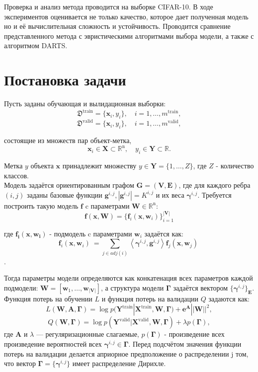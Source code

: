\documentclass[12pt,twoside]{article}
\begin{document}
Проверка и анализ метода проводится на выборке CIFAR-10\cite{CIFAR-10}. В ходе экспериментов оценивается не только качество, которое дает полученная модель но и её вычислительная сложность и устойчивость. Проводится сравнение представленного метода с эвристическими алгоритмами выбора модели, а также с алгоритмом DARTS.

\section{Постановка задачи}

Пусть заданы обучающая и вылидационная выборки:
\[
\mathfrak{D}^{\text{train}} = \{\mathbf{x}_i, y_i\}, \quad i=1,\dots,m^{\text{train}},
\]
\[
\mathfrak{D}^{\text{valid}} = \{\mathbf{x}_i, y_i\}, \quad i=1,\dots,m^{\text{valid}},
\]

состоящие из множеств пар объект-метка,
\[
\mathbf{x}_i\in\mathbf{X}\subset\mathbb{R}^{\text{n}},\quad y_i\in\mathbf{Y}\subset\mathbb{R}.
\] 

Метка $y$ объекта $\mathbf{x}$ принадлежит множеству $y\in\mathbf{Y}= \{1,\dots,Z\}$, где $Z$ - количество классов.
\\

Модель задаётся ориентированным графом $\mathbf{G=(V,E)}$, где для каждого ребра $(i,j)$ заданы базовые функции $\mathbf{g}^{i,j}, |\mathbf{g}^{i,j}| = K^{i,j}$ и их веса $\boldsymbol{\gamma}^{i,j}$. Требуется построить такую модель $\mathbf{f}$ c параметрами $\mathbf{W}\in\mathbb{R}^\text{n}$:
\[
\mathbf{f}(\mathbf{x}, \mathbf{W})= \{ \mathbf{f}_i(\mathbf{x}, \mathbf{w}_i)\}_{i=1}^\mathbf{|V|}
\]

где $\mathbf{f_i(x, w_i)}$ - подмодель c параметрами $\mathbf{w}_i$ задаётся как:
\[
\mathbf{f}_i(\mathbf{x}, \mathbf{w}_i)\ = \sum_{j\in adj(i)} \left\langle {\boldsymbol{\gamma}^{i,j}, \mathbf{g}^{i,j}} \right\rangle \mathbf{f}_j(\mathbf{x}, \mathbf{w}_j)\
\].

Тогда параметры модели определяются как конкатенация всех параметров каждой подмодели: $\mathbf{W}=[\mathbf{w}_1,\dots,\mathbf{w}_\mathbf{|V|}]$, а структура модели $\boldsymbol{\Gamma}$ задаётся вектором $\{ \boldsymbol{\gamma}^{i,j}\}_\mathbf{E}$.
\\

Функция потерь на обучении $L$ и функция потерь на валидации $Q$ задаются как:
\[
L (\mathbf{W}, \mathbf{A}, \boldsymbol{\Gamma})= \log p(\mathbf{Y}^\text{train}|\mathbf{X}^\text{train}, \mathbf{W}, \boldsymbol{\Gamma}) + \boldsymbol{e}^{\mathbf{A}}||\mathbf{W}||^2,
\]
\[
Q (\mathbf{W}, \boldsymbol{\Gamma})= \log p(\mathbf{Y}^\text{valid}|\mathbf{X}^\text{valid}, \mathbf{W}, \boldsymbol{\Gamma}) + \lambda p(\boldsymbol{\Gamma}),
\]
где $\mathbf{A}$ и $\lambda$ --- регуляризационные слагаемые, $p(\boldsymbol{\Gamma})$ - произведение всех произведение вероятностей всех $\boldsymbol{\gamma}^{i,j} \in \boldsymbol{\Gamma}$. Перед подсчётом значения  функции потерь на валидации делается априорное предположение  о распределении j том, что вектор
$\boldsymbol{\Gamma} = \{ \boldsymbol{\gamma}^{i,j}\}$ имеет распределение Дирихле\cite{Dirichlet}.
\\
\end{document}
